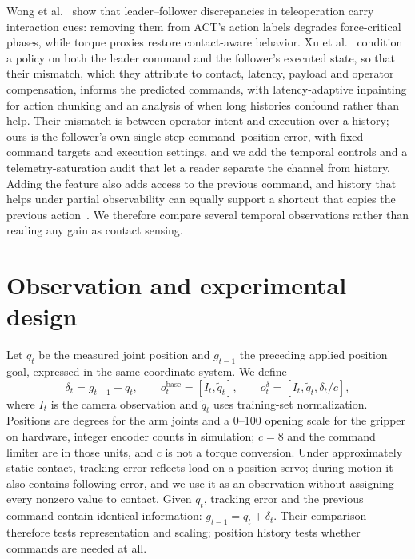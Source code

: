 \documentclass{article}
\begin{document}
Wong et al.~\citep{wong2026beyond} show that leader--follower discrepancies in
teleoperation carry interaction cues: removing them from ACT's action labels
degrades force-critical phases, while torque proxies restore contact-aware
behavior. Xu et al.~\citep{xu2026mindgap} condition a policy on both the
leader command and the follower's executed state, so that their mismatch,
which they attribute to contact, latency, payload and operator compensation,
informs the predicted commands, with latency-adaptive inpainting for action
chunking and an analysis of when long histories confound rather than help.
Their mismatch is between operator intent and execution over a history; ours
is the follower's own single-step command--position error, with fixed command
targets and execution settings, and we add the temporal controls and a
telemetry-saturation audit that let a reader separate the channel from
history. Adding the feature also adds access to the
previous command, and history that helps under partial observability can
equally support a shortcut that copies the previous
action~\citep{wen2020copycat,wen2021keyframe,mark2026bpp}. We therefore compare several temporal observations rather than reading any
gain as contact sensing.

\section{Observation and experimental design}
Let $q_t$ be the measured joint position and $g_{t-1}$ the preceding applied
position goal, expressed in the same coordinate system. We define
\begin{equation}
\delta_t = g_{t-1}-q_t,\qquad
 o_t^{\mathrm{base}}=[I_t,\widetilde q_t],\qquad
 o_t^{\delta}=[I_t,\widetilde q_t,\delta_t/c],
\end{equation}
where $I_t$ is the camera observation and $\widetilde q_t$ uses training-set
normalization. Positions are degrees for the arm joints and a 0--100 opening
scale for the gripper on hardware, integer encoder counts in simulation; $c=8$
and the command limiter are in those units, and $c$ is not a torque
conversion. Under approximately static contact,
tracking error reflects load on a position servo; during motion it also
contains following error, and we use it as an observation without assigning
every nonzero value to contact. Given $q_t$, tracking error and the previous
command contain identical information: $g_{t-1}=q_t+\delta_t$. Their comparison
therefore tests representation and scaling; position history tests whether
commands are needed at all.
\end{document}
